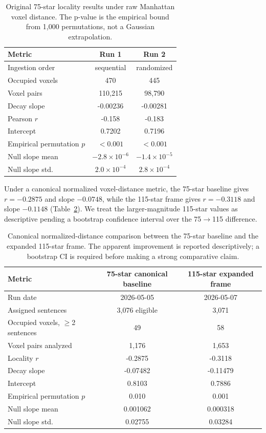 \documentclass[11pt]{article}
\begin{document}
\begin{table}[t]
\centering
\small
\begin{tabular}{@{}lcc@{}}
\toprule
Metric & Run 1 & Run 2 \\
\midrule
Ingestion order & sequential & randomized \\
Occupied voxels & 470 & 445 \\
Voxel pairs & 110,215 & 98,790 \\
Decay slope & -0.00236 & -0.00281 \\
Pearson $r$ & -0.158 & -0.183 \\
Intercept & 0.7202 & 0.7196 \\
Empirical permutation $p$ & $<0.001$ & $<0.001$ \\
Null slope mean & $-2.8{\times}10^{-6}$ & $-1.4{\times}10^{-5}$ \\
Null slope std. & $2.0{\times}10^{-4}$ & $2.8{\times}10^{-4}$ \\
\bottomrule
\end{tabular}
\caption{Original 75-star locality results under raw Manhattan voxel distance. The p-value is the empirical bound from 1,000 permutations, not a Gaussian extrapolation.}
\label{tab:original-locality}
\end{table}

Under a canonical normalized voxel-distance metric, the 75-star baseline gives $r=-0.2875$ and slope $-0.0748$, while the 115-star frame gives $r=-0.3118$ and slope $-0.1148$ (Table~\ref{tab:expanded-baseline}). We treat the larger-magnitude 115-star values as descriptive pending a bootstrap confidence interval over the 75$\rightarrow$115 difference.

\begin{table}[t]
\centering
\small
\begin{tabular}{@{}lcc@{}}
\toprule
Metric & 75-star canonical baseline & 115-star expanded frame \\
\midrule
Run date & 2026-05-05 & 2026-05-07 \\
Assigned sentences & 3,076 eligible & 3,071 \\
Occupied voxels, $\geq$2 sentences & 49 & 58 \\
Voxel pairs analyzed & 1,176 & 1,653 \\
Locality $r$ & -0.2875 & -0.3118 \\
Decay slope & -0.07482 & -0.11479 \\
Intercept & 0.8103 & 0.7886 \\
Empirical permutation $p$ & 0.010 & 0.001 \\
Null slope mean & 0.001062 & 0.000318 \\
Null slope std. & 0.02755 & 0.03284 \\
\bottomrule
\end{tabular}
\caption{Canonical normalized-distance comparison between the 75-star baseline and the expanded 115-star frame. The apparent improvement is reported descriptively; a bootstrap CI is required before making a strong comparative claim.}
\label{tab:expanded-baseline}
\end{table}
\end{document}
